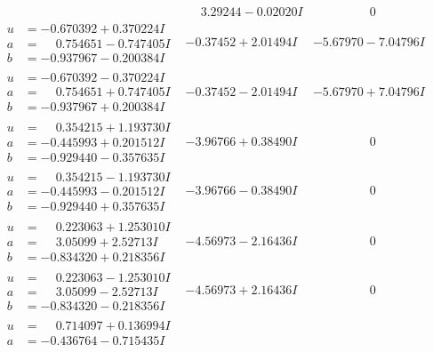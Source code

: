 \documentclass[1p]{elsarticle_modified}
\theoremstyle{definition}
\begin{document}
$$\begin{array}{c|c|c}
 & \phantom{-}3.29244 - 0.02020 I & \phantom{-0.000000 } 0 \\ \hline\begin{aligned}
u &= -0.670392 + 0.370224 I \\
a &= \phantom{-}0.754651 - 0.747405 I \\
b &= -0.937967 - 0.200384 I\end{aligned}
 & -0.37452 + 2.01494 I & -5.67970 - 7.04796 I \\ \hline\begin{aligned}
u &= -0.670392 - 0.370224 I \\
a &= \phantom{-}0.754651 + 0.747405 I \\
b &= -0.937967 + 0.200384 I\end{aligned}
 & -0.37452 - 2.01494 I & -5.67970 + 7.04796 I \\ \hline\begin{aligned}
u &= \phantom{-}0.354215 + 1.193730 I \\
a &= -0.445993 + 0.201512 I \\
b &= -0.929440 - 0.357635 I\end{aligned}
 & -3.96766 + 0.38490 I & \phantom{-0.000000 } 0 \\ \hline\begin{aligned}
u &= \phantom{-}0.354215 - 1.193730 I \\
a &= -0.445993 - 0.201512 I \\
b &= -0.929440 + 0.357635 I\end{aligned}
 & -3.96766 - 0.38490 I & \phantom{-0.000000 } 0 \\ \hline\begin{aligned}
u &= \phantom{-}0.223063 + 1.253010 I \\
a &= \phantom{-}3.05099 + 2.52713 I \\
b &= -0.834320 + 0.218356 I\end{aligned}
 & -4.56973 - 2.16436 I & \phantom{-0.000000 } 0 \\ \hline\begin{aligned}
u &= \phantom{-}0.223063 - 1.253010 I \\
a &= \phantom{-}3.05099 - 2.52713 I \\
b &= -0.834320 - 0.218356 I\end{aligned}
 & -4.56973 + 2.16436 I & \phantom{-0.000000 } 0 \\ \hline\begin{aligned}
u &= \phantom{-}0.714097 + 0.136994 I \\
a &= -0.436764 - 0.715435 I \\

\end{aligned}
\end{array}$$
\end{document}
